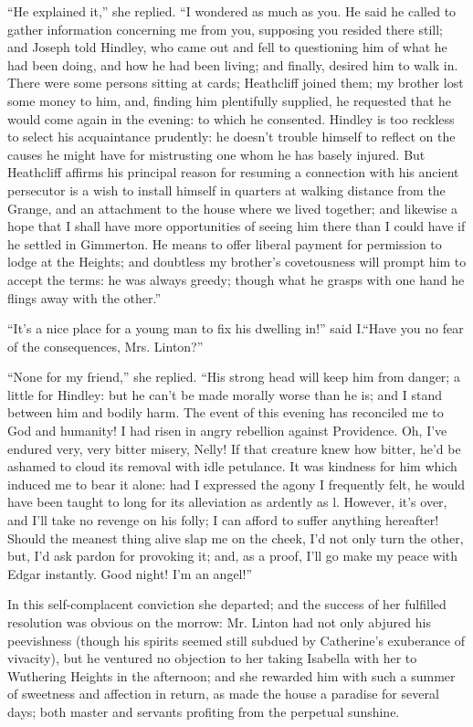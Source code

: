 \par “He explained it,” she replied. “I wondered as much as you. He said he called to gather information concerning me from you, supposing you resided there still; and Joseph told Hindley, who came out and fell to questioning him of what he had been doing, and how he had been living; and finally, desired him to walk in. There were some persons sitting at cards; Heathcliff joined them; my brother lost some money to him, and, finding him plentifully supplied, he requested that he would come again in the evening: to which he consented. Hindley is too reckless to select his acquaintance prudently: he doesn't trouble himself to reflect on the causes he might have for mistrusting one whom he has basely injured. But Heathcliff affirms his principal reason for resuming a connection with his ancient persecutor is a wish to install himself in quarters at walking distance from the Grange, and an attachment to the house where we lived together; and likewise a hope that I shall have more opportunities of seeing him there than I could have if he settled in Gimmerton. He means to offer liberal payment for permission to lodge at the Heights; and doubtless my brother's covetousness will prompt him to accept the terms: he was always greedy; though what he grasps with one hand he flings away with the other.”
\par “It's a nice place for a young man to fix his dwelling in!” said I.“Have you no fear of the consequences, Mrs. Linton?”
\par “None for my friend,” she replied. “His strong head will keep him from danger; a little for Hindley: but he can't be made morally worse than he is; and I stand between him and bodily harm. The event of this evening has reconciled me to God and humanity! I had risen in angry rebellion against Providence. Oh, I've endured very, very bitter misery, Nelly! If that creature knew how bitter, he'd be ashamed to cloud its removal with idle petulance. It was kindness for him which induced me to bear it alone: had I expressed the agony I frequently felt, he would have been taught to long for its alleviation as ardently as l. However, it's over, and I'll take no revenge on his folly; I can afford to suffer anything hereafter! Should the meanest thing alive slap me on the cheek, I'd not only turn the other, but, I'd ask pardon for provoking it; and, as a proof, I'll go make my peace with Edgar instantly. Good night! I'm an angel!”
\par In this self-complacent conviction she departed; and the success of her fulfilled resolution was obvious on the morrow: Mr. Linton had not only abjured his peevishness (though his spirits seemed still subdued by Catherine's exuberance of vivacity), but he ventured no objection to her taking Isabella with her to Wuthering Heights in the afternoon; and she rewarded him with such a summer of sweetness and affection in return, as made the house a paradise for several days; both master and servants profiting from the perpetual sunshine.
